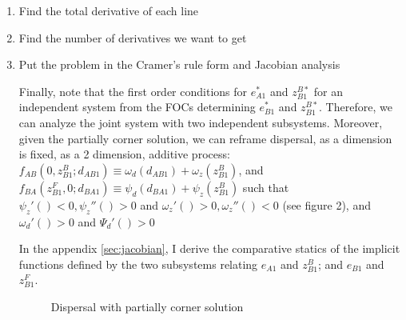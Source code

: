 \documentclass{article}
\begin{document}
\begin{enumerate}
\item Find the total derivative of each line
\item Find the number of derivatives we want to get
\item Put the problem in the Cramer's rule form and Jacobian analysis

Finally, note that the first order conditions for $e_{A1}^*$ and $z_{B1}^{B*}$ for an independent system from the FOCs determining $e_{B1}^*$ and $z_{B1}^{B*}$. Therefore, we can analyze the joint system with two independent subsystems. Moreover, given the partially corner solution, we can reframe dispersal, as a dimension is fixed, as a 2 dimension, additive process: $f_{AB}(0, z_{B1}^B; d_{AB1}) \equiv \omega_d(d_{AB1}) + \omega_z \left(z_{B1}^B \right)$, and $f_{BA}(z_{B1}^F, 0 ; d_{BA1}) \equiv \psi_d(d_{BA1}) + \psi_z \left(z_{B1}^B \right)$ such that $\psi_z'()<0, \psi_z''()>0$ and $\omega_z'()>0, \omega_z''()<0$ (see figure 2), and $\omega_d'()>0$ and $\Psi_d'()>0$

In the appendix \ref{sec:jacobian}, I derive the comparative statics of the implicit functions defined by the two subsystems relating $e_{A1}$ and $z_{B1}^B$; and $e_{B1}$ and $z_{B1}^F$.

\begin{figure}
	\label{fig:additive_dispersal}
	\begin{center}
		\caption{Dispersal with partially corner solution}
	\end{center}
\end{figure}



\end{enumerate}
\end{document}
